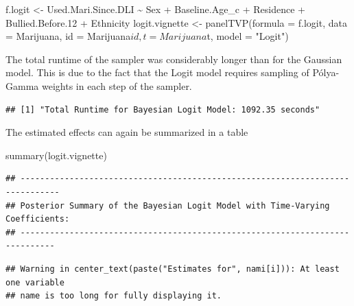 \documentclass[a4paper, preprint, 3p,
authoryear]{elsarticle} %
\newenvironment{Shaded}{\begin{snugshade}}{\end{snugshade}}
\newcommand{\NormalTok}[1]{#1}
\begin{document}
\begin{Shaded}
\begin{Highlighting}[]
\NormalTok{f.logit \textless{}{-} Used.Mari.Since.DLI \textasciitilde{} Sex + Baseline.Age\_c + Residence + Bullied.Before.12 + Ethnicity}
\NormalTok{logit.vignette \textless{}{-} panelTVP(formula = f.logit,}
\NormalTok{                           data = Marijuana,}
\NormalTok{                           id = Marijuana$id,}
\NormalTok{                           t = Marijuana$t,}
\NormalTok{                           model = "Logit")}
\end{Highlighting}
\end{Shaded}

The total runtime of the sampler was considerably longer than for the
Gaussian model. This is due to the fact that the Logit model requires
sampling of Pólya-Gamma weights in each step of the sampler.

\begin{Shaded}
\end{Shaded}

\begin{verbatim}
## [1] "Total Runtime for Bayesian Logit Model: 1092.35 seconds"
\end{verbatim}

The estimated effects can again be summarized in a table

\begin{Shaded}
\begin{Highlighting}[]
\NormalTok{summary(logit.vignette)}
\end{Highlighting}
\end{Shaded}

\begin{verbatim}
## ------------------------------------------------------------------------------
## Posterior Summary of the Bayesian Logit Model with Time-Varying Coefficients:
## -----------------------------------------------------------------------------
\end{verbatim}

\begin{verbatim}
## Warning in center_text(paste("Estimates for", nami[i])): At least one variable
## name is too long for fully displaying it.
\end{verbatim}
\end{document}
